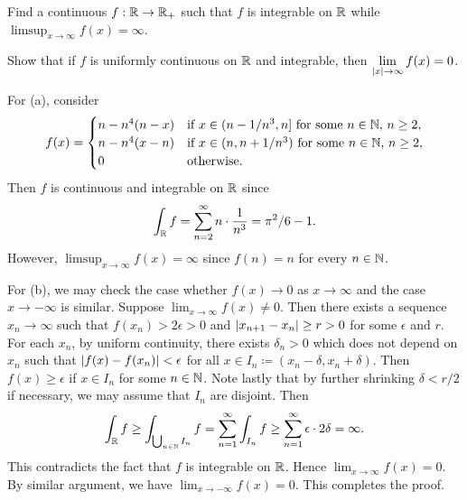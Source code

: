 \begin{exercise}
    \begin{thmenum}
        \item Find a continuous $f:\mathbb{R}\to\mathbb{R}_+$ such that $f$ is integrable on 
        $\mathbb{R}$ while $\displaystyle\limsup_{x\to\infty}f(x)=\infty$. 
        \item Show that if $f$ is uniformly continuous on $\mathbb{R}$ and integrable, 
        then $\displaystyle\lim_{\left\lvert {x} \right\rvert\to\infty}f(x)=0$.
    \end{thmenum}
\end{exercise}
\begin{pf}
    For (a), consider 
    \begin{equation*}
        f(x) = \begin{cases}
            n-n^4(n-x) & \text{if $x\in (n-1/n^3,n]$ for some $n\in\mathbb{N}$, $n\geq 2$}, \\
            n-n^4(x-n) & \text{if $x\in (n,n+1/n^3)$ for some $n\in\mathbb{N}$, $n\geq 2$}, \\
            0 & \text{otherwise}.
        \end{cases}
    \end{equation*}
    Then $f$ is continuous and integrable on $\mathbb{R}$ since 
    \begin{equation*}
        \int_{\mathbb{R}} f = \sum_{n=2}^{\infty} n\cdot \frac{1}{n^3} = \pi^2/6 - 1.
    \end{equation*}
    However, $\displaystyle\limsup_{x\to\infty}f(x)=\infty$ since $f(n)=n$ for 
    every $n\in\mathbb{N}$. 

    For (b), we may check the case whether $f(x)\to 0$ as $x\to\infty$ and the case 
    $x\to -\infty$ is similar. Suppose $\displaystyle\lim_{x\to\infty}f(x)\neq 0$. Then 
    there exists a sequence $x_n\to\infty$ such that $f(x_n)>2\epsilon>0$ and 
    $\left\lvert {x_{n+1}-x_n} \right\rvert\geq r>0$ for some $\epsilon$ and $r$. For each $x_n$, by uniform 
    continuity, there exists $\delta_n>0$ which does not depend on $x_n$ such that 
    $\left\lvert {f(x)-f(x_n)} \right\rvert<\epsilon$ for all $x\in I_n\coloneqq (x_n-\delta, x_n+\delta)$. 
    Then $f(x)\geq \epsilon$ if $x\in I_n$ for some $n\in\mathbb{N}$. Note lastly that by 
    further shrinking $\delta<r/2$ if necessary, we may assume that $I_n$ are disjoint. 
    Then 
    \begin{equation*}
        \int_{\mathbb{R}} f \geq \int_{\bigcup_{n\in\mathbb{N}} I_n} f = \sum_{n=1}^{\infty} \int_{I_n} f 
        \geq \sum_{n=1}^{\infty} \epsilon\cdot 2\delta = \infty.
    \end{equation*}
    This contradicts the fact that $f$ is integrable on $\mathbb{R}$. Hence $\displaystyle
    \lim_{x\to\infty}f(x)=0$. By similar argument, we have $\displaystyle
    \lim_{x\to-\infty}f(x)=0$. This completes the proof.
\end{pf}

